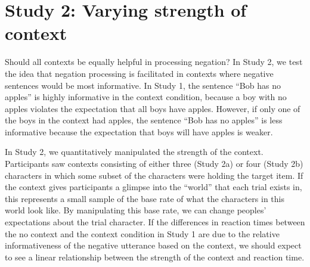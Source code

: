 \documentclass[10pt,letterpaper]{article}
\begin{document}




\section{Study 2: Varying strength of context}

Should all contexts be equally helpful in processing negation? In Study 2, we test the idea that negation processing is facilitated in contexts where negative sentences would be most informative.  In Study 1, the sentence ``Bob has no apples'' is highly informative in the context condition, because a boy with no apples violates the expectation that all boys have apples.  However, if only one of the boys in the context had apples, the sentence ``Bob has no apples'' is less informative because the expectation that boys will have apples is weaker.

In Study 2, we quantitatively manipulated the strength of the context.  Participants saw contexts consisting of either three (Study 2a) or four (Study 2b) characters in which some subset of the characters were holding the target item.  If the context gives participants a glimpse into the ``world'' that each trial exists in, this represents a small sample of the base rate of what the characters in this world look like.  By manipulating this base rate, we can change peoples' expectations about the trial character.  If the differences in reaction times between the no context and the context condition in Study 1 are due to the relative informativeness of the negative utterance based on the context, we should expect to see a linear relationship between the strength of the context and reaction time. 
\end{document}
